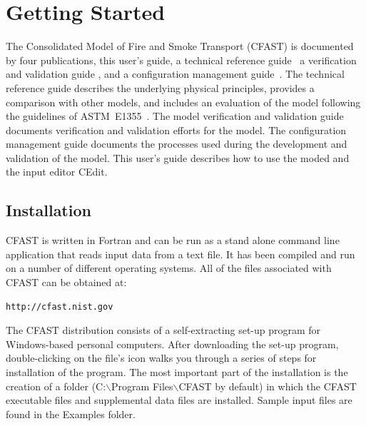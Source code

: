 
\chapter{Getting Started}

The Consolidated Model of Fire and Smoke Transport (CFAST) is documented by four publications, this user's guide, a technical reference guide~\cite{CFAST_Tech_Guide_7} a verification and validation guide \cite{CFAST_Valid_Guide_7}, and a configuration management guide~\cite{CFAST_Config_Guide_7}. The technical reference guide describes the underlying physical principles, provides a comparison with other models, and includes an evaluation of the model following the guidelines of ASTM~E1355~\cite{ASTM:E1355}. The model verification and validation guide documents verification and validation efforts for the model. The configuration management guide documents the processes used during the development and validation of the model. This user's guide describes how to use the moded and the input editor CEdit.

\section{Installation}

CFAST is written in Fortran and can be run as a stand alone command line application that reads input data from a text file. It has been compiled and run on a number of different operating systems. All of the files associated with CFAST can be obtained at:
\begin{lstlisting}
http://cfast.nist.gov
\end{lstlisting}
The CFAST distribution consists of a self-extracting set-up program for Windows-based personal computers. After downloading the set-up program, double-clicking on the file's icon walks you through a series of steps for installation of the program.  The most important part of the installation is the creation of a folder ({\ct C:$\backslash$Program Files$\backslash$CFAST} by default) in which the CFAST executable files and supplemental data files are installed.  Sample input files are found in the {\ct Examples} folder.


